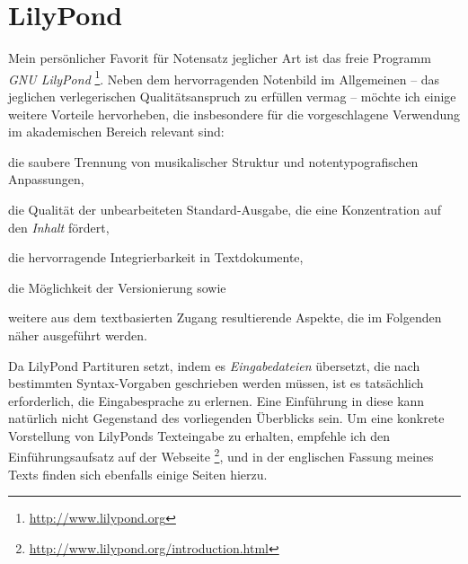 \documentclass[DIV=12]{scrreprt}
\begin{document}
\chapter{LilyPond}
\label{chap:pt_lilypond}
Mein persönlicher Favorit für Notensatz jeglicher Art ist das freie Programm \emph{GNU LilyPond}%
\footnote{\url{http://www.lilypond.org}}.
Neben dem hervorragenden Notenbild im Allgemeinen -- das jeglichen verlegerischen Qualitätsanspruch zu erfüllen vermag -- möchte ich einige weitere Vorteile hervorheben, die insbesondere für die vorgeschlagene Verwendung im akademischen Bereich relevant sind:

\begin{itemize*}
\item die saubere Trennung von musikalischer Struktur und notentypografischen Anpassungen,
\item die Qualität der unbearbeiteten Standard-Ausgabe, die eine Konzentration auf den \emph{Inhalt} fördert,
\item die hervorragende Integrierbarkeit in Textdokumente,
\item die Möglichkeit der Versionierung sowie
\item weitere aus dem textbasierten Zugang resultierende Aspekte, die im Folgenden näher ausgeführt werden.
\end{itemize*}

Da LilyPond Partituren setzt, indem es \emph{Eingabedateien} übersetzt, die nach bestimmten Syntax-Vorgaben geschrieben werden müssen, ist es tatsächlich erforderlich, die Eingabesprache zu erlernen.
Eine Einführung in diese kann natürlich nicht Gegenstand des vorliegenden Überblicks sein.
Um eine konkrete Vorstellung von LilyPonds Texteingabe zu erhalten, empfehle ich den Einführungsaufsatz auf der Webseite%
\footnote{\url{http://www.lilypond.org/introduction.html}}, und in der englischen Fassung meines Texts finden sich ebenfalls einige Seiten hierzu.
\end{document}
